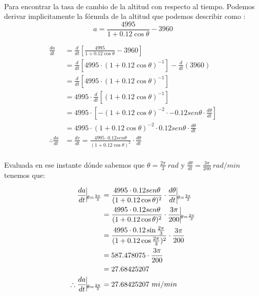 \documentclass[12pt]{article}
\begin{document}
\begin{enumerate}
\\ Para encontrar la tasa de cambio de la altitud con respecto al tiempo. Podemos derivar implicitamente la fórmula de la altitud que podemos describir como :
\[
a = \frac{4995}{1+0.12\cos{\theta}} - 3960
\]

\begin{equation*}
  \begin{split}
  \frac{da}{dt}
    &= \frac{d}{dt}\left[\frac{4995}{1+0.12\cos{\theta}}-3960\right]\\
  &= \frac{d}{dt}\left[4995 \cdot (1+0.12\cos{\theta})^{-1}\right]- \frac{d}{dt} (3960)\\
  &= \frac{d}{dt}\left[4995 \cdot (1+0.12\cos{\theta})^{-1}\right]\\
  &= 4995 \cdot \frac{d}{dt}\left[(1+0.12\cos{\theta})^{-1}\right]\\
  &= 4995 \cdot \left[-(1+0.12\cos{\theta})^{-2} \cdot -0.12sen\theta \cdot   \frac{d\theta}{dt}  \right]\\
   &=  4995 \cdot (1+0.12\cos{\theta})^{-2} \cdot 0.12sen\theta \cdot   \frac{d\theta}{dt}  \\
    \therefore
   \frac{da}{dt} 
   &= \frac{dr}{dt} 
   = \frac{4995 \cdot  0.12sen\theta }{(1+0.12\cos{\theta})^{2}}  \cdot   \frac{d\theta}{dt} \\
  \end{split}
\end{equation*}

Evaluada en ese instante dónde sabemos que  $\theta =  \frac{2\pi}{3} ~ rad $ y $\frac{d\theta}{dt} = \frac{3\pi}{200} ~ rad/min $ tenemos que:

\begin{equation*}
  \begin{split}
  \frac{da}{dt} \vline _{\theta = \frac{2\pi}{3} }
  &=\frac{4995 \cdot  0.12sen\theta }{(1+0.12\cos{\theta})^{2}}  \cdot   \frac{d\theta}{dt}  \vline _{\theta = \frac{2\pi}{3} } \\
  &=\frac{4995 \cdot  0.12sen\theta }{(1+0.12\cos{\theta})^{2}}  \cdot    \frac{3\pi}{200}  \vline _{\theta = \frac{2\pi}{3} } \\
  &=\frac{4995 \cdot  0.12\sin{\frac{2\pi}{3}} }{(1+0.12\cos{\frac{2\pi}{3}})^{2}}  \cdot    \frac{3\pi}{200}  \\
  &=587.478075  \cdot    \frac{3\pi}{200}  \\
  &=27.68425207  \\
  \therefore
   \frac{da}{dt} \vline _{\theta = \frac{2\pi}{3} }
     &=27.68425207 ~ mi/min \\
  \end{split}
\end{equation*}


\end{enumerate}
\end{document}
